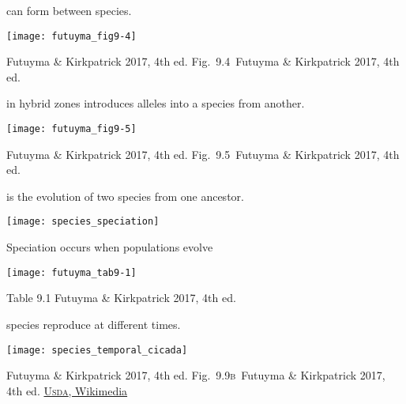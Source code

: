 \documentclass[t]{beamer}
\newcommand{\futuyma}[1]{%
	\ifthenelse{\isempty{#1}}%
	{Futuyma \& Kirkpatrick 2017, 4th ed.}%
	{Fig.~#1~Futuyma \& Kirkpatrick 2017, 4th ed.}%
}
\newcommand{\backskip}{\vspace{-0.5\baselineskip}}
\begin{document}


\begin{frame}{ can form between  species.}

\backskip

\centering

\texttt{[image: futuyma\_fig9-4]}

\tinyfill \futuyma{9.4}
\end{frame}

\begin{frame}{ in hybrid zones introduces alleles into a species from another.}

\backskip

\centering
\texttt{[image: futuyma\_fig9-5]}

\tinyfill \futuyma{9.5}

\end{frame}




\begin{frame}{ is the evolution of two species from one ancestor.}

\vspace{-\baselineskip}

\centering

\texttt{[image: species\_speciation]}

\end{frame}



\begin{frame}{Speciation occurs when populations evolve }

\backskip
\centering

\texttt{[image: futuyma\_tab9-1]}

\tinyfill Table 9.1 Futuyma \& Kirkpatrick 2017, 4th ed.

\end{frame}


\begin{frame}{ species reproduce at different times. }

\texttt{[image: species\_temporal\_cicada]}

\vfilll

\tiny {} \hfill \futuyma{9.9\textsc{b}} \quad \href{https://commons.wikimedia.org/wiki/File:Periodical_Cicada_Broods_of_the_United_States.png}{U\textsc{sda}, Wikimedia}

\end{frame}
\end{document}
